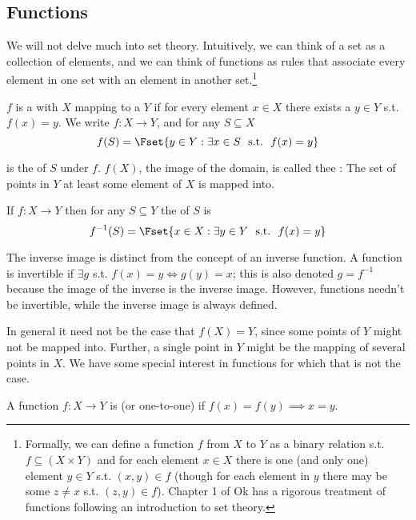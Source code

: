 \documentclass{article}
\begin{document}
\subsection{Functions}
\label{sub:functions}

We will not delve much into set theory. Intuitively, we can think of a set as a collection of elements, and we can think of functions as rules that associate every element in one set with an element in another set.\footnote{Formally, we can define a function $f$ from $X$ to $Y$ as a binary relation s.t. $f \subseteq (X \times Y)$ and for each element $x \in X$ there is one (and only one) element $y \in Y$ s.t. $(x, y) \in f$ (though for each element in $y$ there may be some $z \ne x$ s.t. $(z, y) \in f$). Chapter 1 of Ok has a rigorous treatment of functions following an introduction to set theory.}
\begin{definition}[function]\label{def:lecture1_functions}
  $f$ is a  with  $X$ mapping to a  $Y$ if for every element $x \in X$ there exists a $y \in Y$ s.t. $f(x) = y$. We write $f: X \to Y$, and for any $S \subseteq X$
\[
  f(S) = \Fset{y \in Y: \exists x \in S ~~\text{s.t.}~~ f(x) = y}
\]

  is the  of $S$ under $f$. $f(X)$, the image of the domain, is called thee : The set of points in $Y$ at least some element of $X$ is mapped into.
\end{definition}

\begin{definition}\label{def:lecture1_inverse_image}
  If $f: X \to Y$ then for any $S \subseteq Y$ the  of $S$ is
  \[
    f^{-1}(S) = \Fset{
      x \in X: \exists y \in Y ~~\text{s.t.}~~ f(x) = y
    }
  \]
\end{definition}

\begin{remark}
  The inverse image is distinct from the concept of an inverse function. A function is invertible if $\exists g$ s.t. $f(x) = y \iff g(y) = x$; this is also denoted $g = f^{-1}$ because the image of the inverse is the inverse image. However, functions needn't be invertible, while the inverse image is always defined.
\end{remark}

In general it need not be the case that $f(X) = Y$, since some points of $Y$ might not be mapped into. Further, a single point in $Y$ might be the mapping of several points in $X$. We have some special interest in functions for which that is not the case.
\begin{definition}[injective]\label{def:lecture1_injective}
  A function $f: X \to Y$ is  (or one-to-one) if $f(x) = f(y) \implies x = y$.
\end{definition}
\end{document}
